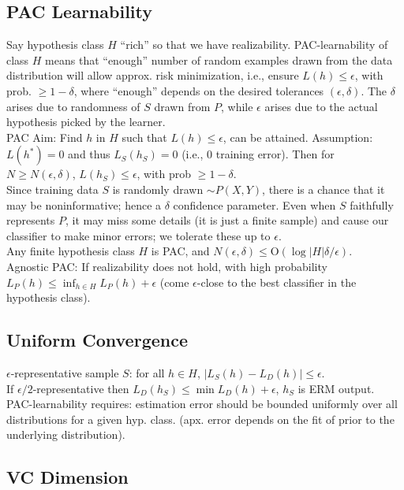 \subsection*{PAC Learnability}
Say hypothesis class $H$ “rich” so that we have realizability. PAC-learnability of class $H$ means that “enough” number of random examples drawn from the data distribution will allow approx. risk minimization, i.e., ensure $L(h) \leq \epsilon$, with prob. $\geq 1-\delta$, where “enough” depends on the desired tolerances $(\epsilon, \delta)$. The $\delta$ arises due to randomness of $S$ drawn from $P$, while $\epsilon$ arises due to the actual hypothesis picked by the learner.\\
PAC Aim: Find $h$ in $H$ such that $L(h) \leq \epsilon$, can be attained. Assumption: $L(h^*)=0$ and thus $L_S(h_S)=0$ (i.e., 0 training error). Then for $N \geq N(\epsilon, \delta)$, $L(h_S) \leq \epsilon$, with prob $\geq 1-\delta$.\\
Since training data $S$ is randomly drawn $\sim P(X,Y)$, there is a chance that it may be noninformative; hence a $\delta$ confidence parameter. Even when $S$ faithfully represents $P$, it may miss some details (it is just a finite sample) and cause our classifier to make minor errors; we tolerate these up to $\epsilon$.\\
Any finite hypothesis class $H$ is PAC, and $N(\epsilon, \delta) \leq \text{O}(\log|H|\delta/\epsilon)$.\\
Agnostic PAC: If realizability does not hold, with high probability $L_{P}(h) \leq \inf_{h \in H} L_{P}(h) + \epsilon$ (come $\epsilon$-close to the best classifier in the hypothesis class).

\subsection*{Uniform Convergence}

$\epsilon$-representative sample $S$: for all $h \in H$, $|L_S(h) - L_D(h)| \leq \epsilon$.\\
If $\epsilon / 2$-representative then $L_D(h_S) \leq \min L_D(h) + \epsilon$, $h_S$ is ERM output.\\
PAC-learnability requires: estimation error should be bounded uniformly over all distributions for a given hyp. class. (apx. error depends on the fit of prior to the underlying distribution).

\subsection*{VC Dimension}


